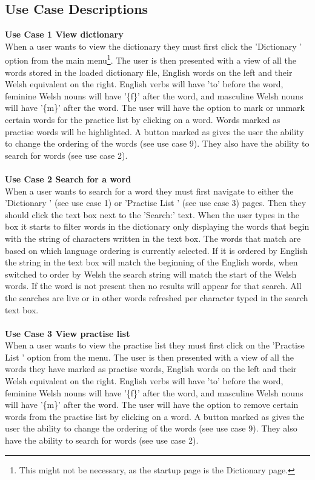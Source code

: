 \documentclass{project}
\newcommand*{\icon}[1]{%
  \raisebox{-.3\baselineskip}{%
    \texttt{[image: \#1]}%
  }%
}
\begin{document}
\subsection{Use Case Descriptions}
\textbf{Use Case 1 View dictionary}
\\
When a user wants to view the dictionary they must first click the 'Dictionary \icon{dictionary-icon}' option from the main menu\footnote{This might not be necessary, as the startup page is the Dictionary page.}. The user is then presented with a view of all the words stored in the loaded dictionary file, English words on the left and their Welsh equivalent on the right. English verbs will have 'to' before the word, feminine Welsh nouns will have '\{f\}' after the word, and masculine Welsh nouns will have '\{m\}' after the word. The user will have the option to mark or unmark certain words for the practice list by clicking on a word. Words marked as practise words will be highlighted. A button marked as \icon{order-icon} gives the user the ability to change the ordering of the words (see use case 9). They also have the ability to search for words (see use case 2).
\\\\
\textbf{Use Case 2 Search for a word}
\\
When a user wants to search for a word they must first navigate to either the 'Dictionary \icon{dictionary-icon}' (see use case 1) or 'Practise List \icon{practise-icon}' (see use case 3) pages. Then they should click the text box next to the 'Search:' text. When the user types in the box it starts to filter words in the dictionary only displaying the words that begin with the string of characters written in the text box. The words that match are based on which language ordering is currently selected. If it is ordered by English the string in the text box will match the beginning of the English words, when switched to order by Welsh the search string will match the start of the Welsh words. If the word is not present then no results will appear for that search. All the searches are live or in other words refreshed per character typed in the search text box.
\\\\
\textbf{Use Case 3 View practise list}
\\
When a user wants to view the practise list they must first click on the 'Practise List \icon{practise-icon}' option from the menu. The user is then presented with a view of all the words they have marked as practise words, English words on the left and their Welsh equivalent on the right. English verbs will have 'to' before the word, feminine Welsh nouns will have '\{f\}' after the word, and masculine Welsh nouns will have '\{m\}' after the word. The user will have the option to remove certain words from the practise list by clicking on a word. A button marked as \icon{order-icon} gives the user the ability to change the ordering of the words (see use case 9). They also have the ability to search for words (see use case 2).
\end{document}
